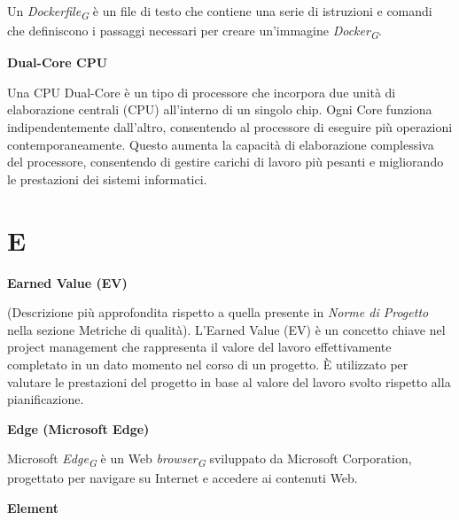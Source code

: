 \documentclass{article}
\begin{document}
Un \textit{Dockerfile}\textsubscript{\textit{G}} è un file di testo che contiene una serie di istruzioni e comandi che definiscono i passaggi necessari per creare un'immagine \textit{Docker}\textsubscript{\textit{G}}.

\vspace{0.4cm}

\textbf{Dual-Core CPU}

\vspace{0.1cm}

Una CPU Dual-Core è un tipo di processore che incorpora due unità di elaborazione centrali (CPU) all'interno di un singolo chip. Ogni Core funziona indipendentemente dall'altro, consentendo al processore di eseguire più operazioni contemporaneamente. Questo aumenta la capacità di elaborazione complessiva del processore, consentendo di gestire carichi di lavoro più pesanti e migliorando le prestazioni dei sistemi informatici.

\pagebreak
\section*{E}
{}

\vspace{0.4cm}

\textbf{Earned Value (EV)}

\vspace{0.1cm}

(Descrizione più approfondita rispetto a quella presente in \textit{Norme di Progetto} nella sezione Metriche di qualità). L'Earned Value (EV) è un concetto chiave nel project management che rappresenta il valore del lavoro effettivamente completato in un dato momento nel corso di un progetto. È utilizzato per valutare le prestazioni del progetto in base al valore del lavoro svolto rispetto alla pianificazione.

\vspace{0.4cm}

\textbf{Edge (Microsoft Edge)}

\vspace{0.1cm}

Microsoft \textit{Edge}\textsubscript{\textit{G}} è un Web \textit{browser}\textsubscript{\textit{G}} sviluppato da Microsoft Corporation, progettato per navigare su Internet e accedere ai contenuti Web.

\vspace{0.4cm}

\textbf{Element}
\end{document}
